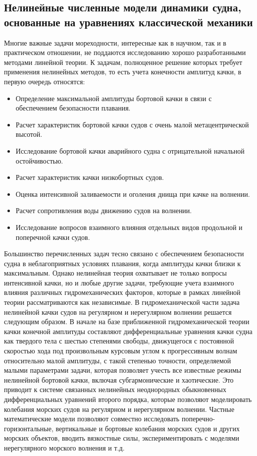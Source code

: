 \subsection{Нелинейные численные модели динамики судна, основанные на уравнениях классической механики}
Многие важные задачи мореходности, интересные как в научном, так и в практическом отношении, не поддаются исследованию хорошо разработанными методами линейной теории. К задачам, полноценное решение которых требует применения нелинейных методов, то есть учета конечности амплитуд качки, в первую очередь относятся:

\begin{itemize}
	\item	Определение максимальной амплитуды бортовой качки в связи с обеспечением безопасности плавания.
	\item	Расчет характеристик бортовой качки судов с очень малой метацентрической высотой.
	\item	Исследование бортовой качки аварийного судна с отрицательной начальной остойчивостью.
	\item	Расчет характеристик качки низкобортных судов.
	\item	Оценка интенсивной заливаемости и оголения днища при качке на волнении.
	\item	Расчет сопротивления воды движению судов на волнении.
	\item	Исследование вопросов взаимного влияния отдельных видов продольной и поперечной качки судов.
\end{itemize}

Большинство перечисленных задач тесно связано с обеспечением безопасности судна в неблагоприятных условиях плавания, когда амплитуды качки близки к максимальным. Однако нелинейная теория охватывает не только вопросы интенсивной качки, но и любые другие задачи, требующие учета взаимного влияния различных гидромеханических факторов, которые в рамках линейной теории рассматриваются как независимые. В гидромеханической части задача нелинейной качки судов на регулярном и нерегулярном волнении решается следующим образом. В начале на базе приближенной гидромеханической теории качки конечной амплитуды составляют дифференциальные уравнения качки судна как твердого тела с шестью степенями свободы, движущегося с постоянной скоростью хода под произвольным курсовым углом к прогрессивным волнам относительно малой амплитуды, с такой степенью точности, определяемой малыми параметрами задачи, которая позволяет учесть все известные режимы нелинейной бортовой качки, включая субгармонические и хаотические. Это приводит к системе связанных нелинейных неоднородных обыкновенных дифференциальных уравнений второго порядка, которые позволяют моделировать колебания морских судов на регулярном и нерегулярном волнении. Частные математические модели позволяют совместно исследовать поперечно-горизонтальные, вертикальные и бортовые колебания морских судов и других морских объектов, вводить вязкостные силы, экспериментировать с моделями нерегулярного морского волнения и т.д.

